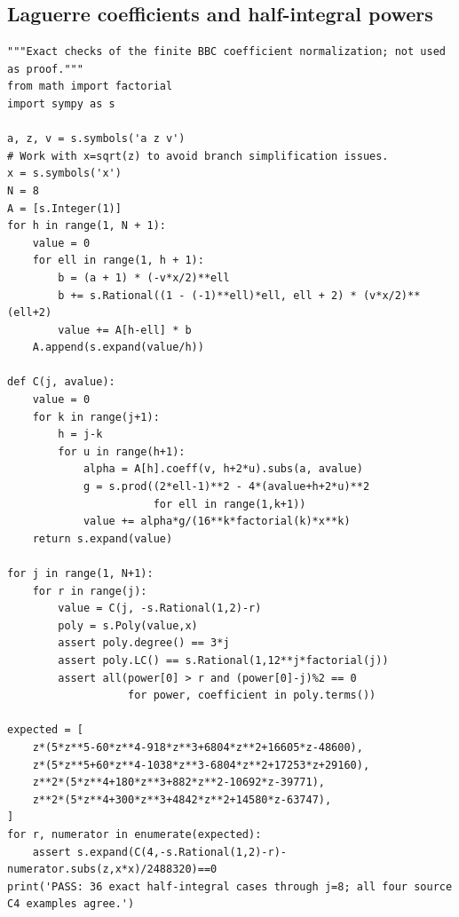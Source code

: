 \documentclass[11pt,a4paper]{article}
\theoremstyle{definition}
\theoremstyle{remark}
\numberwithin{equation}{section}
\begin{document}
\subsection{Laguerre coefficients and half-integral powers}
\begin{lstlisting}
"""Exact checks of the finite BBC coefficient normalization; not used as proof."""
from math import factorial
import sympy as s

a, z, v = s.symbols('a z v')
# Work with x=sqrt(z) to avoid branch simplification issues.
x = s.symbols('x')
N = 8
A = [s.Integer(1)]
for h in range(1, N + 1):
    value = 0
    for ell in range(1, h + 1):
        b = (a + 1) * (-v*x/2)**ell
        b += s.Rational((1 - (-1)**ell)*ell, ell + 2) * (v*x/2)**(ell+2)
        value += A[h-ell] * b
    A.append(s.expand(value/h))

def C(j, avalue):
    value = 0
    for k in range(j+1):
        h = j-k
        for u in range(h+1):
            alpha = A[h].coeff(v, h+2*u).subs(a, avalue)
            g = s.prod((2*ell-1)**2 - 4*(avalue+h+2*u)**2
                       for ell in range(1,k+1))
            value += alpha*g/(16**k*factorial(k)*x**k)
    return s.expand(value)

for j in range(1, N+1):
    for r in range(j):
        value = C(j, -s.Rational(1,2)-r)
        poly = s.Poly(value,x)
        assert poly.degree() == 3*j
        assert poly.LC() == s.Rational(1,12**j*factorial(j))
        assert all(power[0] > r and (power[0]-j)%2 == 0
                   for power, coefficient in poly.terms())

expected = [
    z*(5*z**5-60*z**4-918*z**3+6804*z**2+16605*z-48600),
    z*(5*z**5+60*z**4-1038*z**3-6804*z**2+17253*z+29160),
    z**2*(5*z**4+180*z**3+882*z**2-10692*z-39771),
    z**2*(5*z**4+300*z**3+4842*z**2+14580*z-63747),
]
for r, numerator in enumerate(expected):
    assert s.expand(C(4,-s.Rational(1,2)-r)-numerator.subs(z,x*x)/2488320)==0
print('PASS: 36 exact half-integral cases through j=8; all four source C4 examples agree.')
\end{lstlisting}
\end{document}

